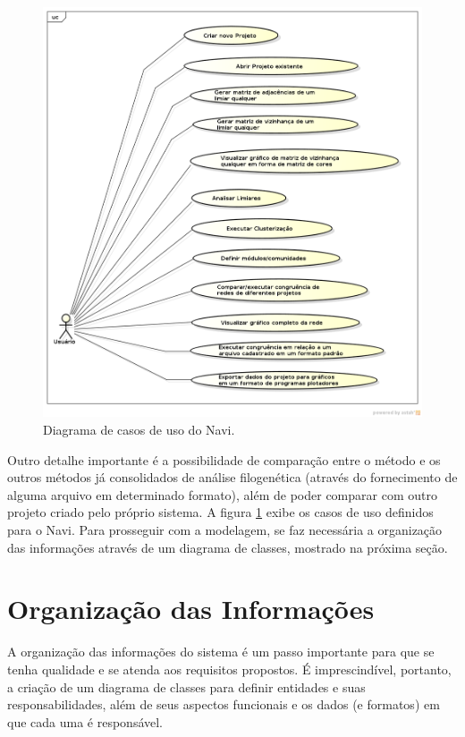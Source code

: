 \begin{figure}
\centering
\includegraphics[scale=0.52]{diagrama-casos-de-uso}
\caption{Diagrama de casos de uso do Navi.}
\label{fig:casos-uso}
\end{figure}

Outro detalhe importante é a possibilidade de comparação entre o método e os outros métodos já consolidados de análise filogenética (através do fornecimento
de alguma arquivo em determinado formato), além de poder comparar com outro projeto criado pelo próprio sistema. A figura \ref{fig:casos-uso} exibe os casos
de uso definidos para o Navi. Para prosseguir com a modelagem, se faz necessária a organização das informações através de um diagrama de classes,
mostrado na próxima seção.

\section{Organização das Informações} \label{sec:organizacao}

A organização das informações do sistema é um passo importante para que se tenha qualidade e se atenda aos requisitos propostos. É imprescindível, portanto,
a criação de um diagrama de classes para definir entidades e suas responsabilidades, além de seus aspectos funcionais e os dados (e formatos) em que cada uma
é responsável.

